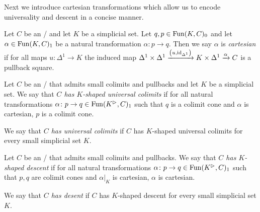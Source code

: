 Next we introduce cartesian transformations which allow us to encode universality and descent in a concise manner.
\begin{definition}
    Let $C$ be an \inftycat/ and let $K$ be a simplicial set.
    Let $q,p\in\operatorname{Fun}(K,C)_0$ and let $\alpha\in\operatorname{Fun}(K,C)_1$ be a natural transformation $\alpha\colon p\to q$.
    Then we say $\alpha$ is \emph{cartesian} if for all maps $u\colon\Delta^1\to K$ the induced map $\Delta^1\times\Delta^1\xrightarrow{\left(u,\text{id}_{\Delta^1}\right)}K\times\Delta^1\xrightarrow{\alpha}C$ is a pullback square. %
\end{definition}
\begin{definition}[Universality]
    Let $C$ be an \inftycat/ that admits small colimits and pullbacks and let $K$ be a simplicial set.
    We say that \emph{$C$ has $K$-shaped universal colimits} if for all natural transformations $\alpha\colon p\to q\in\operatorname{Fun}(K^{\rhd},C)_1$ such that $q$ is a colimit cone and $\alpha$ is cartesian, $p$ is a colimit cone.
    
    We say that \emph{$C$ has universal colimits} if $C$ has $K$-shaped universal colimits for every small simplicial set $K$.
\end{definition}
\begin{definition}[Descent]
    Let $C$ be an \inftycat/ that admits small colimits and pullbacks.
    We say that \emph{$C$ has $K$-shaped descent} if for all natural transformations $\alpha\colon p\to q\in\operatorname{Fun}(K^{\rhd},C)_1$ such that $p,q$ are colimit cones and $\alpha|_K$ is cartesian, $\alpha$ is cartesian.
    
    We say that \emph{$C$ has desent} if $C$ has $K$-shaped descent for every small simplicial set $K$.
\end{definition}
